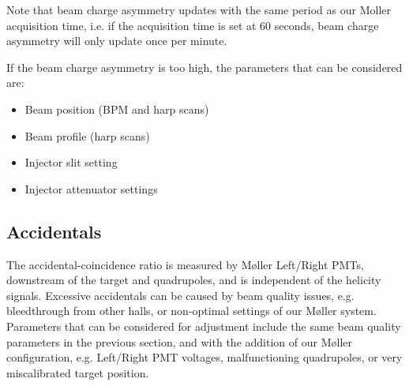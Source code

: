 \documentclass[amsmath,amssymb,notitlepage,12pt]{revtex4}
\begin{document}
Note that beam charge asymmetry updates with the same period as our Moller acquisition time, i.e. if the acquisition time is set at 60 seconds, beam charge asymmetry will only update once per minute.%

If the beam charge asymmetry is too high, the parameters that can be considered are:
\begin{itemize}
\vspace{-4mm}\item Beam position (BPM and harp scans)
\vspace{-4mm}\item Beam profile (harp scans)
\vspace{-4mm}\item Injector slit setting
\vspace{-4mm}\item Injector attenuator settings
\end{itemize}

\subsection{Accidentals}
The accidental-coincidence ratio is measured by M{\o}ller Left/Right PMTs, downstream of the target and quadrupoles, and is independent of the helicity signals.  Excessive accidentals can be caused by beam quality issues, e.g. bleedthrough from other halls, or non-optimal settings of our M{\o}ller system.  Parameters that can be considered for adjustment include the same beam quality parameters in the previous section, and with the addition of our M{\o}ller configuration, e.g. Left/Right PMT voltages, malfunctioning quadrupoles, or very miscalibrated target position.

\newpage
\end{document}
